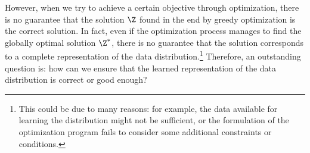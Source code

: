 \documentclass[../../book-main.tex]{subfiles}
\begin{document}

However, when we try to achieve a certain objective through
optimization, there is no guarantee that the solution $\Z$ found
in the end by greedy optimization is the correct solution. In fact, even if
the optimization process manages to find the globally optimal
solution $\Z^*$, there is no guarantee that the solution corresponds
to a complete representation of the data distribution.\footnote{This
    could be due to many reasons: for example, the data available for
    learning the distribution might not be sufficient, or the formulation
    of the optimization program fails to consider some additional
constraints or conditions.} Therefore, an outstanding question is:
how can we ensure that the learned representation of the data distribution is
correct or good enough?
\end{document}
